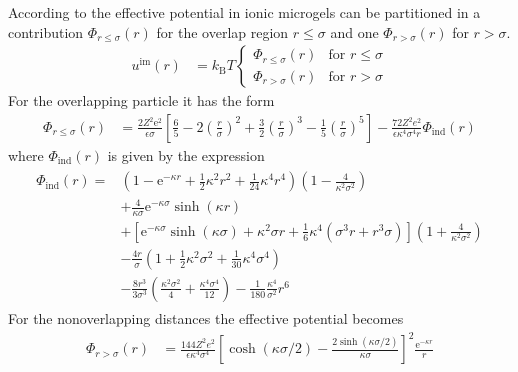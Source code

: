 According to \cite{Likos2011} the effective potential in ionic microgels can be partitioned in a contribution
$\Phi_{r \leq \sigma}(r)$ for the overlap region $r \leq \sigma$ and one $\Phi_{r > \sigma}(r)$ for $r>\sigma$.
\begin{align}
u^\text{im}(r) &= k_\text{B} T
\begin{cases}
\Phi_{r\leq\sigma}(r)   & \mbox{for } r \leq \sigma \\
\Phi_{r>\sigma}(r)      & \mbox{for } r > \sigma
\end{cases}
\end{align}
For the overlapping particle it has the form
\begin{align}
\Phi_{r\leq\sigma}(r) &= \frac{2Z^2\text{e}^2}{\epsilon\sigma}
                         \left[\frac{6}{5}-2\left(\frac{r}{\sigma}\right)^2
                                          +\frac{3}{2}\left(\frac{r}{\sigma}\right)^3
                                          -\frac{1}{5}\left(\frac{r}{\sigma}\right)^5
                         \right]
                        - \frac{72 Z^2e^2}{\epsilon\kappa^4\sigma^4r}\Phi_\text{ind}(r)
\end{align}
where $\Phi_\text{ind}(r)$ is given by the expression
\begin{align}
\begin{split}
  \Phi_\text{ind}(r) =&  \left(1-\text{e}^{-\kappa r}+\frac{1}{2}\kappa^2r^2+\frac{1}{24}\kappa^4r^4\right)
                        \left(1-\frac{4}{\kappa^2\sigma^2}\right) \\
                     & +\frac{4}{\kappa\sigma}\text{e}^{-\kappa\sigma}\sinh\left(\kappa r\right)\\
                     & +\left[\text{e}^{-\kappa\sigma}\sinh\left(\kappa\sigma\right)
                                    +\kappa^2\sigma r
                                    +\frac{1}{6}\kappa^4\left(\sigma^3 r + r^3 \sigma \right)
                        \right] \left(1+\frac{4}{\kappa^2\sigma^2}\right)\\
                     & -\frac{4r}{\sigma} \left(1+\frac{1}{2}\kappa^2\sigma^2+\frac{1}{30}\kappa^4\sigma^4\right) \\
                     & -\frac{8r^3}{3\sigma^3}\left(\frac{\kappa^2\sigma^2}{4}+\frac{\kappa^4\sigma^4}{12}\right)
                       -\frac{1}{180}\frac{\kappa^4}{\sigma^2} r^6
\end{split}
\end{align}
For the nonoverlapping distances the effective potential becomes
\begin{align}
\Phi_{r>\sigma}(r) &= \frac{144Z^2e^2}{\epsilon\kappa^4\sigma^4}
                      \left[\cosh\left(\kappa\sigma/2\right)-\frac{2\sinh\left(\kappa\sigma/2\right)}{\kappa\sigma}\right]^2
                      \frac{\text{e}^{-\kappa r}}{r}
\end{align}

